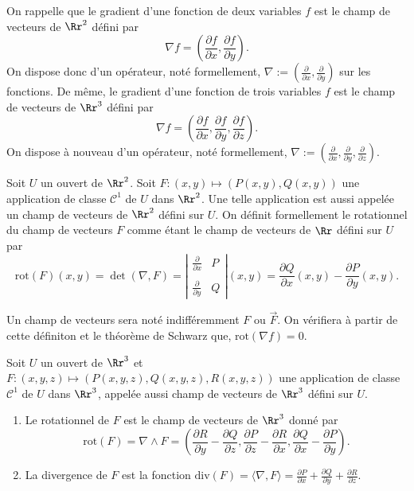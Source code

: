 \documentclass[class=report,crop=false]{standalone}
\begin{document}
\vskip6mm

\noindent On rappelle que le gradient d'une fonction de deux variables $f$ est le champ de vecteurs de $\Rr^2$ défini par
$$\nabla f=\left(\frac{\partial f}{\partial x},\frac{\partial f}{\partial y}\right).$$
On dispose donc d'un opérateur, noté formellement, $\displaystyle \nabla :=\left(\frac{\partial }{\partial x},\frac{\partial }{\partial y}\right)$ sur les fonctions. De m\^eme, le gradient d'une fonction de trois variables $f$ est le champ de vecteurs de $\Rr^3$ défini par
$$\nabla f=\left(\frac{\partial f}{\partial x},\frac{\partial f}{\partial y},\frac{\partial f}{\partial z}\right).$$
On dispose à nouveau d'un opérateur, noté formellement, $\displaystyle \nabla :=\left(\frac{\partial }{\partial x},\frac{\partial }{\partial y},\frac{\partial }{\partial z}\right)$.

\vskip6mm

\begin{definition}Soit $U$ un ouvert de $\Rr^2$. Soit $F:(x,y)\mapsto \left(P(x,y),Q(x,y)\right)$ une application de classe $\mathscr{C}^1$ de $U$ dans $\Rr^2$. Une telle application est aussi appelée un champ de vecteurs de $\Rr^2$ défini sur $U$. On définit formellement le rotationnel du champ de vecteurs $F$ comme étant le champ de vecteurs de $\Rr$ défini sur $U$ par
$$\mathrm{rot}(F)(x,y)=\det (\nabla ,F)=\left|\begin{array}{cc}\frac{\partial}{\partial x}&P\\ \\ \frac{\partial}{\partial y}&Q
\end{array}\right|(x,y)=\frac{\partial Q}{\partial x}(x,y)-\frac{\partial P}{\partial y}(x,y).$$
\end{definition}

\vskip4mm

\noindent Un champ de vecteurs sera noté indifféremment $F$ ou $\overrightarrow{F}$. On vérifiera à partir de cette définiton et le théorème de Schwarz que, $\mbox{rot}(\nabla f)=0$.

\vskip6mm

\begin{definition}Soit $U$ un ouvert de $\Rr^3$ et $F:(x,y,z)\mapsto \left(P(x,y,z),Q(x,y,z),R(x,y,z)\right)$ une application de classe $\mathscr{C}^1$ de $U$ dans $\Rr^3$, appelée aussi champ de vecteurs de $\Rr^3$ défini sur $U$.
\begin{enumerate}
\item Le rotationnel de $F$ est le champ de vecteurs de $\Rr^3$ donné par
$$\mathrm{rot}(F)=\nabla \wedge F=\left(\frac{\partial R}{\partial y}-\frac{\partial Q}{\partial z},\frac{\partial P}{\partial z}-\frac{\partial R}{\partial x},\frac{\partial Q}{\partial x}-\frac{\partial P}{\partial y}\right).$$
\item La divergence de $F$ est la fonction $\displaystyle \mathrm{div}(F)=\langle \nabla ,F\rangle =\frac{\partial P}{\partial x}+\frac{\partial Q}{\partial y}+\frac{\partial R}{\partial z}$.
\end{enumerate}
\end{definition}
\end{document}
